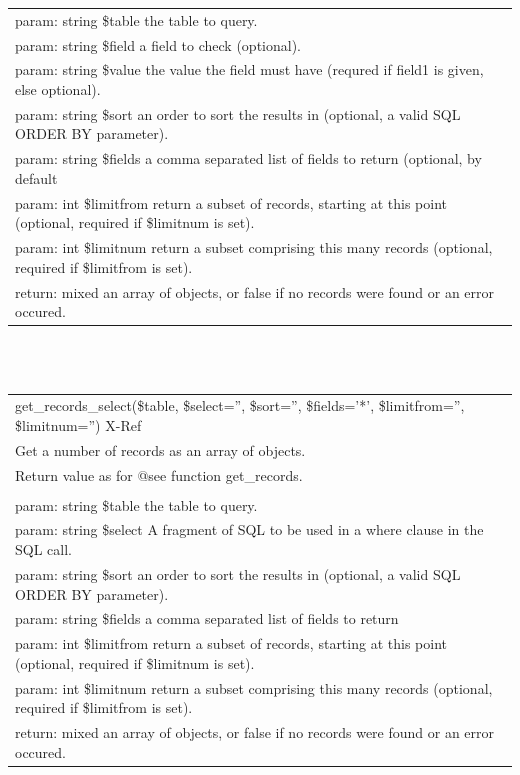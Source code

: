 \documentclass[a4paper]{report}  %
\begin{document}
\begin{tt}
\begin{center}
\begin{tabular}{| p{12cm} |}
	param: string \$table the table to query.\\
	param: string \$field a field to check (optional).\\
	param: string \$value the value the field must have (requred if field1 is given, else optional).\\
	param: string \$sort an order to sort the results in (optional, a valid SQL ORDER BY parameter).\\
	param: string \$fields a comma separated list of fields to return (optional, by default\\
	param: int \$limitfrom return a subset of records, starting at this point (optional, required if \$limitnum is set).\\
	param: int \$limitnum return a subset comprising this many records (optional, required if \$limitfrom is set).\\
	return: mixed an array of objects, or false if no records were found or an error occured.\\
	\hline
	\end{tabular}
	\     \ \\ \     \ \\
   \begin{tabular}{| p{12cm} |} 
	\hline
	\rowcolor[gray]{0.5}get\_records\_select(\$table, \$select='', \$sort='', \$fields='*', \$limitfrom='', \$limitnum='') X-Ref\\
	Get a number of records as an array of objects.\\
	\hline
	Return value as for @see function get\_records.\\
	\\
	param: string \$table the table to query.\\
	param: string \$select A fragment of SQL to be used in a where clause in the SQL call.\\
	param: string \$sort an order to sort the results in (optional, a valid SQL ORDER BY parameter).\\
	param: string \$fields a comma separated list of fields to return\\
	param: int \$limitfrom return a subset of records, starting at this point (optional, required if \$limitnum is set).\\
	param: int \$limitnum return a subset comprising this many records (optional, required if \$limitfrom is set).\\
	return: mixed an array of objects, or false if no records were found or an error occured.\\
	\hline

\end{tabular}
\end{center}
\end{tt}
\end{document}
